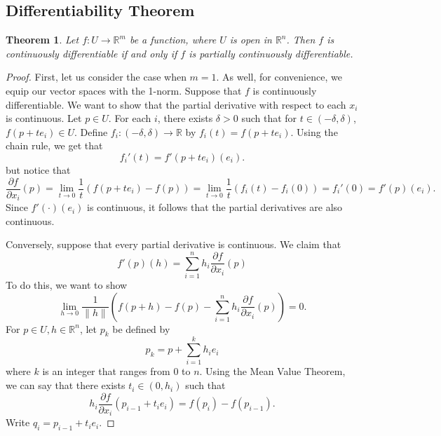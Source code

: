 \documentclass{article}
\theoremstyle{plain} %
\newtheorem{thm}{Theorem}
\numberwithin{thm}{section} %
\theoremstyle{definition}
\begin{document}
    \subsection{Differentiability Theorem}
    \begin{thm}
        Let \(f: U \to \mathbb{R}^m\) be a function, where \(U\) is open in \(\mathbb{R}^n\). Then \(f\) is continuously differentiable if and only if \(f\) is partially continuously differentiable.
    \end{thm}
    \begin{proof}
        First, let us consider the case when \(m = 1\). As well, for convenience, we equip our vector spaces with the 1-norm. Suppose that \(f\) is continuously differentiable. We want to show that the partial derivative with respect to each \(x_i\) is continuous. Let \(p \in U\). For each \(i\), there exists \(\delta > 0\) such that for \(t \in (-\delta , \delta)\), \(f(p + te_i) \in U\). Define \(f_i: (-\delta , \delta) \to \mathbb{R}\) by \(f_i (t) = f(p + te_i)\). Using the chain rule, we get that
        \[
            f_i'(t) = f'(p + te_i)(e_i).
        \]
        but notice that
        \[
            \frac{\partial f}{\partial x_i} (p) = \lim_{t \to 0} \frac{1}{t}(f(p + te_i) - f(p)) = \lim_{t \to 0} \frac{1}{t}(f_i(t) - f_i(0)) = f_i'(0) = f'(p)(e_i).
        \]
        Since \(f'(\cdot)(e_i)\) is continuous, it follows that the partial derivatives are also continuous.

        Conversely, suppose that every partial derivative is continuous. We claim that
        \[
            f'(p)(h) = \sum_{i=1}^{n} h_i \frac{\partial f}{\partial x_i} (p)
        \]
        To do this, we want to show
        \[
            \lim_{h \to 0} \frac{1}{\|h\|}\left( f(p + h) - f(p) - \sum_{i=1}^{n} h_i \frac{\partial f}{\partial x_i} (p) \right) = 0.
        \]
        For \(p \in U, h \in \mathbb{R}^n\), let \(p_k\) be defined by
        \[
            p_k = p + \sum_{i=1}^{k} h_i e_i
        \]
        where \(k\) is an integer that ranges from \(0\) to \(n\). Using the Mean Value Theorem, we can say that there exists \(t_i \in (0, h_i)\) such that
        \[
            h_i \frac{\partial f}{\partial x_i} (p_{i-1} + t_i e_i) = f(p_i) - f(p_{i-1}).
        \]
        Write \(q_i = p_{i-1} + t_i e_i\).


\end{proof}
\end{document}
